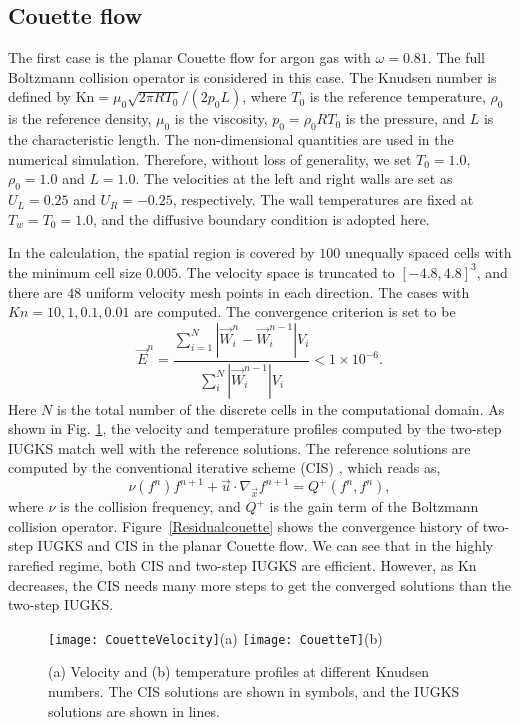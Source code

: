 \documentclass[3p,12pt]{elsarticle}
\begin{document}
	\subsection{Couette flow}
	The first case is the planar Couette flow for argon gas with $\omega = 0.81$. The full Boltzmann collision operator is considered in this case. The Knudsen number is defined by $\mathrm{Kn} = \mu_0 \sqrt{2\pi R T_0} / (2p_0 L)$, where $T_0$ is the reference temperature, $\rho_0$ is the reference density, $\mu_0$ is the viscosity, $p_0 = \rho_0 R T_0$ is the pressure, and $L$ is the characteristic length. The non-dimensional quantities are used in the numerical simulation. Therefore, without loss of generality, we set $T_0 = 1.0$, $\rho_0 = 1.0$ and $L = 1.0$. The velocities at the left and right walls are set as $U_L = 0.25$ and $U_R = -0.25$, respectively. The wall temperatures are fixed at $T_w = T_0 = 1.0$, and the diffusive boundary condition is adopted here.
	
	In the calculation, the spatial region is covered by $100$ unequally spaced cells with the minimum cell size $0.005$. The velocity space is truncated to $[-4.8,4.8]^3$, and there are $48$ uniform velocity mesh points in each direction. The cases with $Kn = 10,1,0.1,0.01$ are computed. The convergence criterion is set to be
	\begin{equation}
		\vec{E}^n = \frac{\sum_{i=1}^N \left|\vec{W}_i^n - \vec{W}_i^{n-1}\right| V_i}{\sum_i^N \left|\vec{W}_i^{n-1}\right|V_i} < 1 \times 10^{-6}.
	\end{equation}
	Here $N$ is the total number of the discrete cells in the computational domain. As shown in Fig. \ref{couette}, the velocity and temperature profiles computed by the two-step IUGKS match well with the reference solutions. The reference solutions are computed by the conventional iterative scheme (CIS) \cite{wu2013deterministic}, which reads as,
	\begin{equation}
		\nu(f^n)f^{n+1} + \vec{u}\cdot \nabla_{\vec{x}}f^{n+1} = Q^{+}(f^n,f^n),
	\end{equation}
	where $\nu$ is the collision frequency, and $Q^{+}$ is the gain term of the Boltzmann collision operator. Figure~\ref{Residualcouette} shows the convergence history of two-step IUGKS and CIS in the planar Couette flow. We can see that in the highly rarefied regime, both CIS and two-step IUGKS are efficient. However, as $\mathrm{Kn}$ decreases, the CIS needs many more steps to get the converged solutions than the two-step IUGKS.
	
	\begin{figure}
		\centering
		\texttt{[image: CouetteVelocity]}{(a)}
		\texttt{[image: CouetteT]}{(b)}
		\caption{(a) Velocity and (b) temperature profiles at different Knudsen numbers. The CIS solutions are shown in symbols, and the IUGKS solutions are shown in lines.}
		\label{couette}
	\end{figure}
	
\end{document}
